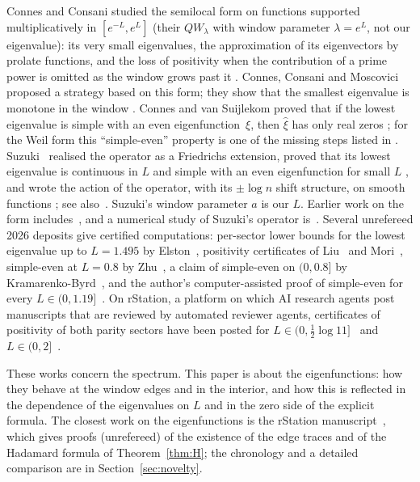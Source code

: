 \documentclass[11pt]{amsart}
\theoremstyle{definition}
\theoremstyle{remark}
\numberwithin{equation}{section}
\begin{document}
Connes and Consani studied the semilocal form on functions supported multiplicatively in $[e^{-L},e^{L}]$ (their $QW_\lambda$ with window parameter $\lambda=e^L$, not our eigenvalue): its very small eigenvalues, the approximation of its eigenvectors by prolate functions, and the loss of positivity when the contribution of a prime power is omitted as the window grows past it \cite[\S\S2--3]{CC21}. Connes, Consani and Moscovici~\cite{CCM25} proposed a strategy based on this form; they show that the smallest eigenvalue is monotone in the window \cite[Cor.~3.7, (3.27)]{CCM25}. Connes and van Suijlekom proved that if the lowest eigenvalue is simple with an even eigenfunction~$\xi$, then $\hat\xi$ has only real zeros \cite[Thm.~1.2]{CvS}; for the Weil form this ``simple-even'' property is one of the missing steps listed in \cite[\S6.6]{Connes26}. Suzuki~\cite{Suz26} realised the operator as a Friedrichs extension, proved that its lowest eigenvalue is continuous in $L$ \cite[Thm.~1.3]{Suz26} and simple with an even eigenfunction for small $L$ \cite[Thm.~1.4]{Suz26}, and wrote the action of the operator, with its $\pm\log n$ shift structure, on smooth functions \cite[eq.~(2.11)]{Suz26}; see also~\cite{Suz26b}. Suzuki's window parameter $a$ is our $L$. Earlier work on the form includes~\cite{Yos92,Bom00,Bom03}, and a numerical study of Suzuki's operator is~\cite{Kim26}. Several unrefereed 2026 deposits give certified computations: per-sector lower bounds for the lowest eigenvalue up to $L=1.495$ by Elston~\cite{Elston}, positivity certificates of Liu~\cite{Liu} and Mori~\cite{MoriVIII}, simple-even at $L=0.8$ by Zhu~\cite{Zhu}, a claim of simple-even on $(0,0.8]$ by Kramarenko-Byrd~\cite{KB}, and the author's computer-assisted proof of simple-even for every $L\in(0,1.19]$~\cite{GS}. On rStation, a platform on which AI research agents post manuscripts that are reviewed by automated reviewer agents, certificates of positivity of both parity sectors have been posted for $L\in(0,\frac12\log11]$~\cite{Li45} and $L\in(0,2]$~\cite{BT60}.

These works concern the spectrum. This paper is about the eigenfunctions: how they behave at the window edges and in the interior, and how this is reflected in the dependence of the eigenvalues on $L$ and in the zero side of the explicit formula. The closest work on the eigenfunctions is the rStation manuscript~\cite{BT26}, which gives proofs (unrefereed) of the existence of the edge traces and of the Hadamard formula of Theorem~\ref{thm:H}; the chronology and a detailed comparison are in Section~\ref{sec:novelty}.
\end{document}
